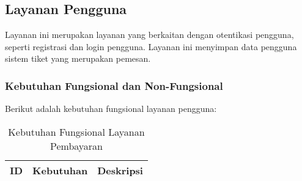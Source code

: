 \subsection{Layanan Pengguna}

Layanan ini merupakan layanan yang berkaitan dengan otentikasi pengguna, seperti registrasi dan login pengguna. Layanan ini menyimpan data pengguna sistem tiket yang merupakan pemesan.

\subsubsection{Kebutuhan Fungsional dan Non-Fungsional}

Berikut adalah kebutuhan fungsional layanan pengguna:

\begingroup
\footnotesize
\begin{longtable}{|l|p{}|p{}|}
    \caption{Kebutuhan Fungsional Layanan Pembayaran}                                                                                                                                                                                                                                                                                                                                                                                                                                                                                                                                                           \\
    \hline
    \textbf{ID} & \textbf{Kebutuhan}                                                                                                                                                                                                              & \textbf{Deskripsi}                                                                                                                                                                                                                                                                                                                                    \\
    \endfirsthead


\end{longtable}
